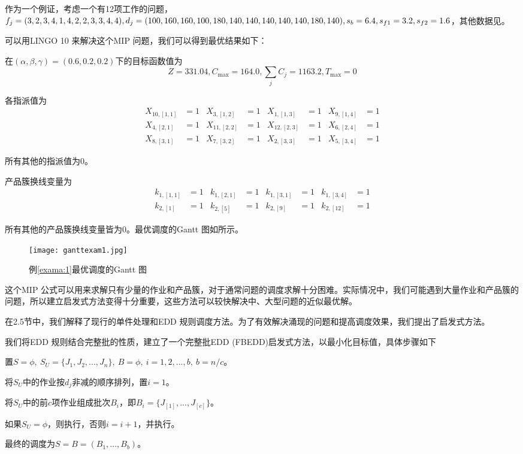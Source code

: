 \begin{example}
作为一个例证，考虑一个有12项工作的问题，$f_j=(3,2,3,4,1,4,2,2,3,3,4,4),d_j=(100,160,160,100,\\
180,140,140,140,140,140,180,140),s_b=6.4,s_{f1}=3.2,s_{f2}=1.6$，其他数据见。\label{exama:1}
\end{example}

可以用LINGO 10 来解决这个MIP 问题，我们可以得到最优结果如下：

在$(\alpha,\beta,\gamma) = (0.6,0.2,0.2)$下的目标函数值为
$$Z = 331.04, C_{\max} = 164.0, {\textstyle\sum_j C_j = 1163.2}, T_{\max} = 0$$

各指派值为
\begin{align*}
 X_{10,[1,1]} & = 1 & X_{3,[1,2]} & = 1 & X_{1,[1,3]} & = 1 & X_{9,[1,4]} & = 1\\
 X_{4,[2,1]} & = 1 & X_{11,[2,2]} & = 1 & X_{12,[2,3]} & = 1 & X_{6,[2,4]} & = 1\\
 X_{8,[3,1]} & = 1 & X_{7,[3,2]} & = 1 & X_{2,[3,3]} & = 1 & X_{5,[3,4]} & = 1
\end{align*}

所有其他的指派值为0。

产品簇换线变量为
\begin{align*}
k_{1,[1,1]} & = 1 & k_{1,[2,1]} & = 1 & k_{1,[3,1]} & = 1 & k_{1,[3,4]} & = 1 \\
k_{2,[1]} & = 1 & k_{2,[5]} & = 1 & k_{2,[9]} & = 1 & k_{2,[12]} & = 1
\end{align*}

所有其他的产品簇换线变量皆为0。最优调度的Gantt 图如所示。
\begin{figure}[h]
\texttt{[image: ganttexam1.jpg]}
\caption{例\ref{exama:1}最优调度的Gantt 图\label{fig:gantt1}}
\end{figure}

这个MIP 公式可以用来求解只有少量的作业和产品簇，对于通常问题的调度求解十分困难。实际情况中，我们可能遇到大量作业和产品簇的问题，所以建立启发式方法变得十分重要，这些方法可以较快解决中、大型问题的近似最优解。

在2.5节中，我们解释了现行的单件处理和EDD 规则调度方法。为了有效解决涌现的问题和提高调度效果，我们提出了启发式方法。

我们将EDD 规则结合完整批的性质，建立了一个完整批EDD (FBEDD)启发式方法，以最小化目标值，具体步骤如下

\begin{asparaenum}
\renewcommand{\labelenumi}{\heiti 步骤\theenumi~}
\item 置$S=\phi,\ S_U = \{J_1,J_2,...,J_n\},\ B=\phi,\ i=1,2,...,b,\ b = n/c$。
\item 将$S_U$中的作业按$d_j$非减的顺序排列，置$i=1$。
\item 将$S_U$中的前$c$项作业组成批次$B_i$，即$B_i = \{J_{[1]},...,J_{[c]}\}$。
\item 如果$S_U = \phi$，则执行，否则$i=i+1$，并执行。
\item 最终的调度为$S=B=(B_1,...,B_b)$。
\end{asparaenum}

